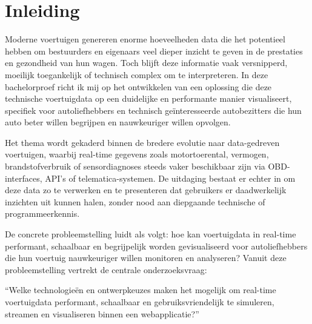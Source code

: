 


% 

\section{Inleiding}%
\label{sec:inleiding}

Moderne voertuigen genereren enorme hoeveelheden data die het potentieel hebben om bestuurders en eigenaars veel dieper inzicht te geven in de prestaties en gezondheid van hun wagen. Toch blijft deze informatie vaak versnipperd, moeilijk toegankelijk of technisch complex om te interpreteren. In deze bachelorproef richt ik mij op het ontwikkelen van een oplossing die deze technische voertuigdata op een duidelijke en performante manier visualiseert, specifiek voor autoliefhebbers en technisch geïnteresseerde autobezitters die hun auto beter willen begrijpen en nauwkeuriger willen opvolgen.

Het thema wordt gekaderd binnen de bredere evolutie naar data-gedreven voertuigen, waarbij real-time gegevens zoals motortoerental, vermogen, brandstofverbruik of sensordiagnoses steeds vaker beschikbaar zijn via OBD-interfaces, API’s of telematica-systemen. De uitdaging bestaat er echter in om deze data zo te verwerken en te presenteren dat gebruikers er daadwerkelijk inzichten uit kunnen halen, zonder nood aan diepgaande technische of programmeerkennis.

De concrete probleemstelling luidt als volgt: hoe kan voertuigdata in real-time performant, schaalbaar en begrijpelijk worden gevisualiseerd voor autoliefhebbers die hun voertuig nauwkeuriger willen monitoren en analyseren? Vanuit deze probleemstelling vertrekt de centrale onderzoeksvraag:

“Welke technologieën en ontwerpkeuzes maken het mogelijk om real-time voertuigdata performant, schaalbaar en gebruiksvriendelijk te simuleren, streamen en visualiseren binnen een webapplicatie?”

